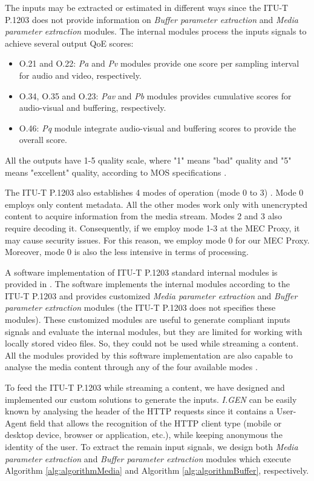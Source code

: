The inputs may be extracted or estimated in different ways since the ITU-T P.1203 does not provide information on \textit{Buffer parameter extraction} and \textit{Media parameter extraction} modules. The internal modules process the inputs signals to achieve several output QoE scores:
\begin{itemize}
	\item O.21 and O.22: \textit{Pa} and \textit{Pv} modules provide one score per sampling interval for audio and video, respectively.
	\item O.34, O.35 and O.23: \textit{Pav} and \textit{Pb} modules provides cumulative scores for audio-visual and buffering, respectively.
	\item O.46: \textit{Pq} module integrate audio-visual and buffering scores to provide the overall score.
\end{itemize}

All the outputs have 1-5 quality scale, where "1" means "bad" quality and "5" means "excellent" quality, according to MOS specifications \cite{Itu2016}.

The ITU-T P.1203 also establishes 4 modes of operation (mode 0 to 3) \cite{itup1203}. Mode 0 employs only content metadata. All the other modes work only with unencrypted content to acquire information from the media stream. Modes 2 and 3 also require decoding it. Consequently, if we employ mode 1-3 at the MEC Proxy, it may cause security issues. For this reason, we employ mode 0 for our MEC Proxy. Moreover, mode 0 is also the less intensive in terms of processing.

A software implementation of ITU-T P.1203 standard internal modules is provided in \cite{itugithub}. The software implements the internal modules \cite{Robitza2018} according to the ITU-T P.1203 and provides customized \textit{Media parameter extraction} and \textit{Buffer parameter extraction} modules (the ITU-T P.1203 does not specifies these modules). These customized modules are useful to generate compliant inputs signals and evaluate the internal modules, but they are limited for working with locally stored video files. So, they could not be used while streaming a content. All the modules provided by this software implementation are also capable to analyse the media content through any of the four available modes \cite{raake2017}.

To feed the ITU-T P.1203 while streaming a content, we have designed and implemented our custom solutions to generate the inputs. \textit{I.GEN} can be easily known by analysing the header of the HTTP requests since it contains a User-Agent field \cite{useragent} that allows the recognition of the HTTP client type (mobile or desktop device, browser or application, etc.), while keeping anonymous the identity of the user. To extract the remain input signals, we design both \textit{Media parameter extraction} and \textit{Buffer parameter extraction} modules which execute Algorithm \ref{alg:algorithmMedia} and Algorithm \ref{alg:algorithmBuffer}, respectively.

